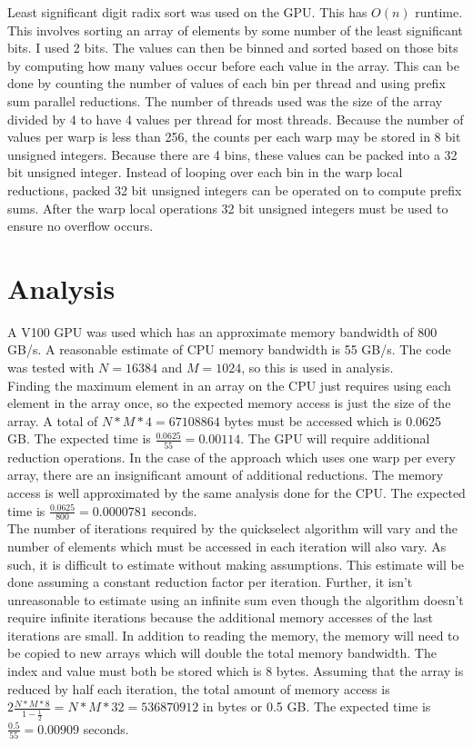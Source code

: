 \documentclass{article}
\begin{document}
Least significant digit radix sort was used on the GPU. This has $O(n)$
runtime. This involves sorting an array of elements by some number of the least
significant bits. I used 2 bits. The values can then be binned and sorted based
on those bits by computing how many values occur before each value in the
array. This can be done by counting the number of values of each bin per thread
and using prefix sum parallel reductions. The number of threads used was the
size of the array divided by 4 to have 4 values per thread for most threads.
Because the number of values per warp is less than 256, the counts per each
warp may be stored in 8 bit unsigned integers. Because there are 4 bins,
these values can be packed into a 32 bit unsigned integer. Instead of looping 
over each bin in the warp local reductions, packed 32 bit unsigned integers
can be operated on to compute prefix sums. After the warp local operations
32 bit unsigned integers must be used to ensure no overflow occurs.

\section{Analysis}

A V100 GPU was used which has an approximate memory bandwidth of 800 GB/s. 
A reasonable estimate of CPU memory bandwidth is 55 GB/s. 
The code was tested with $N = 16384$ and $M = 1024$, so this is used in 
analysis. \\

Finding the maximum element in an array on the CPU just requires using each
element in the array once, so the expected memory access is just the size of
the array. A total of $N * M * 4 =  67108864$ bytes must be accessed which is
0.0625 GB.  The expected time is $\frac{0.0625}{55} = 0.00114$. The GPU will
require additional reduction operations. In the case of the approach which uses
one warp per every array, there are an insignificant amount of additional
reductions.  The memory access is well approximated by the same analysis done
for the CPU.  The expected time is $\frac{0.0625}{800} = 0.0000781$ seconds. \\

The number of iterations required by the quickselect algorithm will vary and
the number of elements which must be accessed in each iteration will also vary.
As such, it is difficult to estimate without making assumptions.  This estimate
will be done assuming a constant reduction factor per iteration.  Further, it
isn't unreasonable to estimate using an infinite sum even though the algorithm
doesn't require infinite iterations because the additional memory accesses of
the last iterations are small.  In addition to reading the memory, the memory
will need to be copied to new arrays which will double the total memory
bandwidth. The index and value must both be stored which is 8 bytes. Assuming
that the array is reduced by half each iteration, the total amount of memory
access is $2 \frac{N * M * 8}{1 - \frac12}  = N * M * 32 = 536870912$ in bytes
or 0.5 GB.  The expected time is $\frac{0.5}{55} = 0.00909$ seconds. \\
\end{document}
